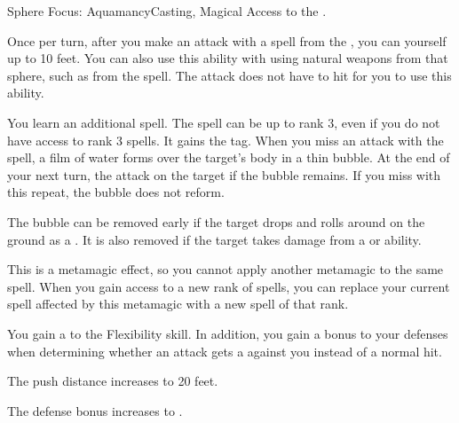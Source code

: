   \begin{magicalfeat}{Sphere Focus: Aquamancy}{Casting, Magical}
    \featpre Access to the  .

     Once per turn, after you make an attack with a spell from the  , you can  yourself up to 10 feet.
    You can also use this ability with  using natural weapons from that sphere, such as from the  spell.
    The attack does not have to hit for you to use this ability.

     You learn an additional spell.
    The spell can be up to rank 3, even if you do not have access to rank 3 spells.
    It gains the \atWater tag.
    When you miss an attack with the spell, a film of water forms over the target's body in a thin bubble.
    At the end of your next turn, the attack  on the target if the bubble remains.
    If you miss with this repeat, the bubble does not reform.

    The bubble can be removed early if the target drops \prone and rolls around on the ground as a .
    It is also removed if the target takes damage from a \atCold or \atFire ability.

    This is a metamagic effect, so you cannot apply another metamagic to the same spell.
    When you gain access to a new rank of spells, you can replace your current spell affected by this metamagic with a new spell of that rank.

     You gain a   to the Flexibility skill.
    In addition, you gain a  bonus to your defenses when determining whether an attack gets a  against you instead of a normal hit.

     The push distance increases to 20 feet.

     The defense bonus increases to .
  \end{magicalfeat}

